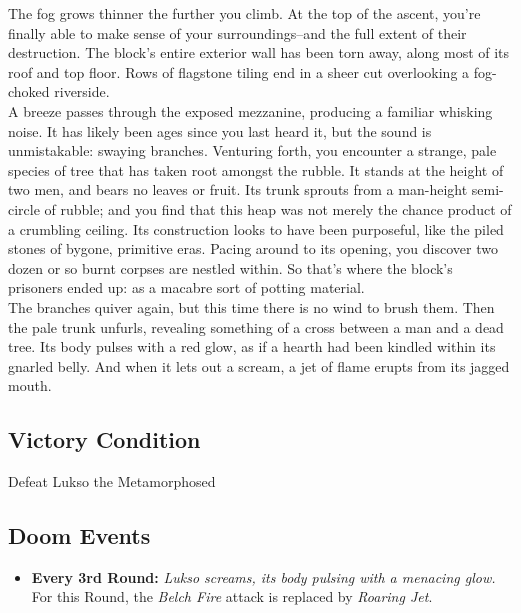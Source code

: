 The fog grows thinner the further you climb. At the top of the ascent, you’re finally able to make sense of your surroundings--and the full extent of their destruction. The block's entire exterior wall has been torn away, along most of its roof and top floor. Rows of flagstone tiling end in a sheer cut overlooking a fog-choked riverside.\\

A breeze passes through the exposed mezzanine, producing a familiar whisking noise. It has likely been ages since you last heard it, but the sound is unmistakable: swaying branches. Venturing forth, you encounter a strange, pale species of tree that has taken root amongst the rubble. It stands at the height of two men, and bears no leaves or fruit. Its trunk sprouts from a man-height semi-circle of rubble; and you find that this heap was not merely the chance product of a crumbling ceiling. Its construction looks to have been purposeful, like the piled stones of bygone, primitive eras. Pacing around to its opening, you discover two dozen or so burnt corpses are nestled within. So that's where the block's prisoners ended up: as a macabre sort of potting material.\\

The branches quiver again, but this time there is no wind to brush them. Then the pale trunk unfurls, revealing something of a cross between a man and a dead tree. Its body pulses with a red glow, as if a hearth had been kindled within its gnarled belly. And when it lets out a scream, a jet of flame erupts from its jagged mouth.\\

\subsection*{Victory Condition}
Defeat Lukso the Metamorphosed

\subsection*{Doom Events}
\begin{itemize}
\item \textbf{Every 3rd Round:} \emph{Lukso screams, its body pulsing with a menacing glow.} For this Round, the \emph{Belch Fire} attack is replaced by \emph{Roaring Jet}.
\end{itemize}

\pagebreak


